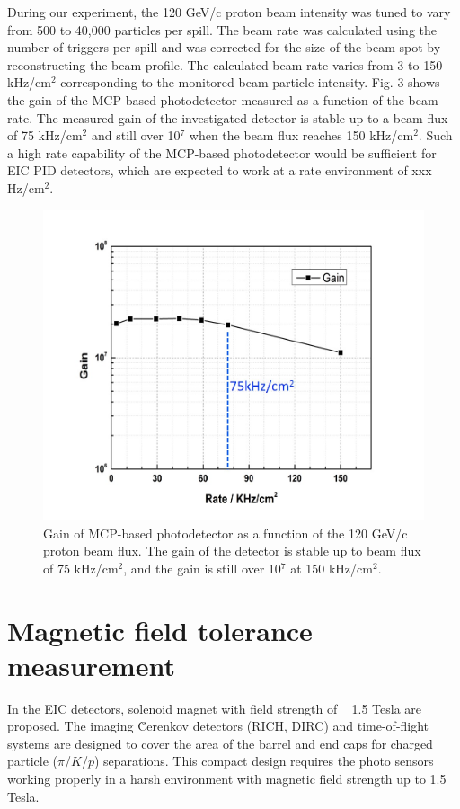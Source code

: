 \documentclass[preprint,5p]{elsarticle}
\begin{document}
During our experiment, the 120 GeV/c proton beam intensity was tuned to vary 
from 500 to 40,000 particles per spill. The beam rate was calculated using the 
number of triggers per spill and was corrected for the size of the beam spot by 
reconstructing the beam profile. The calculated beam rate varies from 3 to 150 
kHz/cm$^2$ corresponding to the monitored beam particle intensity. Fig. 3 shows 
the gain of the MCP-based photodetector measured as a function of the beam 
rate. The measured gain of the investigated detector is stable up to a beam 
flux of 75 kHz/cm$^2$ and still over 10$^7$ when the beam flux reaches 150 
kHz/cm$^2$. Such a high rate capability of the MCP-based photodetector would be 
sufficient for EIC PID detectors, which are expected to work at a rate 
environment of  xxx Hz/cm$^2$.

\begin{figure}[tbp]
\centering 
\includegraphics[scale=0.25]{fig/MCPs_gain_proton_beam.png}
\caption{Gain of MCP-based photodetector as a function of the 120 GeV/c proton 
beam flux. The gain of the detector is stable up to beam flux of 75 kHz/cm$^2$, 
and the gain is still over 10$^7$ at 150 kHz/cm$^2$. } 
\label{fig:MCPs_gain_proton_beam}
\end{figure}

\section{Magnetic field tolerance measurement}\label{sec_B_measurement}
In the EIC detectors, solenoid magnet with field strength of ~ 1.5 Tesla are 
proposed. The imaging \u Cerenkov detectors (RICH, DIRC) and time-of-flight 
systems are designed to cover the area of the barrel and end caps for charged 
particle ($\pi$/$K$/$p$) separations. This compact design requires the photo 
sensors working properly in a harsh environment with magnetic field strength up 
to 1.5 Tesla. 
\end{document}
